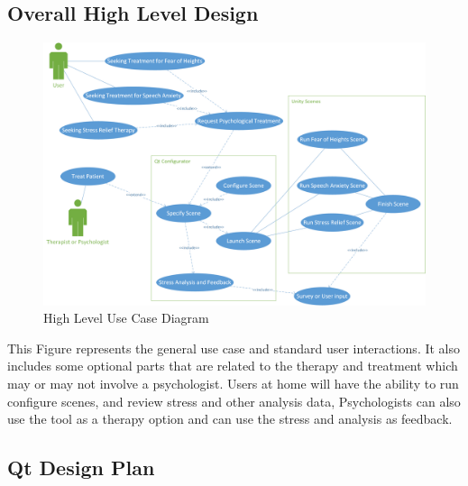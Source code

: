 \documentclass[a4paper,10pt]{article}
\begin{document}
	\subsection{Overall High Level Design}
		\begin{figure}[H]
			\includegraphics[width=\linewidth,height=\paperheight,keepaspectratio]{highUseCase.png}
			\caption{High Level Use Case Diagram}
			\label{fig:highlevelusecase}
		\end{figure}
		This Figure represents the general use case and standard user interactions. It also includes some optional parts that are related to the therapy and treatment which 
		may or may not involve a psychologist. Users at home will have the ability to run configure scenes, and review stress and other analysis data, Psychologists can also use
		the tool as a therapy option and can use the stress and analysis as feedback.
	\pagebreak
	\subsection{Qt Design Plan}
\end{document}
